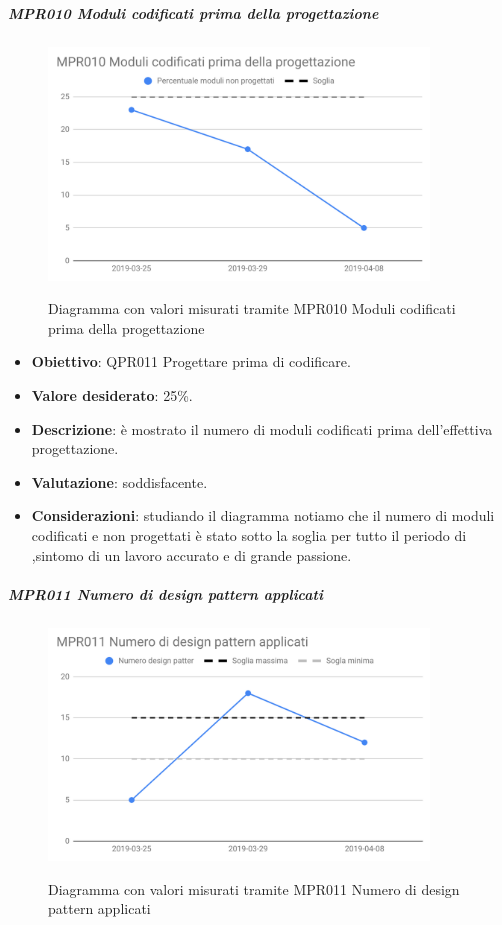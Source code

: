 	\subparagraph{MPR010 Moduli codificati prima della progettazione}
	
	\begin{figure}[H]
		\centering
		\includegraphics[width=0.9\textwidth]{img/cruscotti/RQ/MPR010.png}
		\label{immagineModuliCodificatiRQ}
		\caption{Diagramma con valori misurati tramite MPR010 Moduli codificati prima della progettazione}
	\end{figure}
	
	\begin{itemize}
		\item \textbf{Obiettivo}: QPR011 Progettare prima di codificare.
		\item \textbf{Valore desiderato}: 25\%.
		\item \textbf{Descrizione}: è mostrato il numero di moduli codificati prima dell'effettiva progettazione.
		\item \textbf{Valutazione}: soddisfacente.
		\item \textbf{Considerazioni}: studiando il diagramma notiamo che il numero di moduli codificati e non progettati
		è stato sotto la soglia per tutto il periodo di \RQ,sintomo di un lavoro accurato e di grande passione.
	\end{itemize}

	\subparagraph{MPR011 Numero di design pattern applicati}
	
	\begin{figure}[H]
		\centering
		\includegraphics[width=0.9\textwidth]{img/cruscotti/RQ/MPR011.png}
		\label{immagineNumDesignPatternRQ}
		\caption{Diagramma con valori misurati tramite MPR011 Numero di design pattern applicati}
	\end{figure}
	
